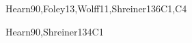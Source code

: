\begin{syllabus}
\begin{unit}{\GVAdvancedRendering}{}{Hearn90,Foley13,Wolff11,Shreiner13}{6}{C1,C4}
   \begin{learningoutcomes} 
        \item \GVAdvancedRenderingLODemonstrateHowEstimates [\Assessment]
        \item \GVAdvancedRenderingLOProveThe [\Assessment]
        \item \GVAdvancedRenderingLOImplementAShading [\Usage]
        \item \GVAdvancedRenderingLODiscussHow [\Familiarity]
        \item \GVAdvancedRenderingLOExplainHowThe [\Familiarity]
   \end{learningoutcomes}
\end{unit}

\begin{unit}{\GVComputerAnimation}{}{Hearn90,Shreiner13}{4}{C1}
   \begin{topics} 
        \item \GVComputerAnimationTopicForward
        \item \GVComputerAnimationTopicCollision
        \item \GVComputerAnimationTopicProcedural
        \item \GVComputerAnimationTopicSkinning
        \item \GVComputerAnimationTopicPhysics
        \item \GVComputerAnimationTopicKey
        \item \GVComputerAnimationTopicSplines
        \item \GVComputerAnimationTopicData
        \item \GVComputerAnimationTopicCamera
        \item \GVComputerAnimationTopicMotion
   \end{topics}

   \begin{learningoutcomes} 
        \item \GVComputerAnimationLOComputeTheOrientation [\Usage]
        \item \GVComputerAnimationLOImplementThe [\Usage]
        \item \GVComputerAnimationLOImplementAlgorithmsModeling [\Usage]
        \item \GVComputerAnimationLODiscussTheBehind [\Familiarity]
        \item \GVComputerAnimationLOUseCommon [\Usage]
   \end{learningoutcomes}
\end{unit}

\begin{coursebibliography}
\end{coursebibliography}

\end{syllabus}
